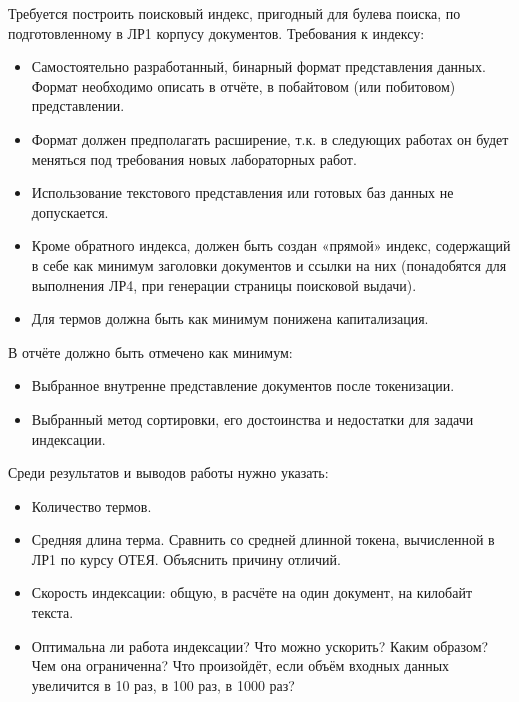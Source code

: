 
Требуется построить поисковый индекс, пригодный для булева поиска, по подготовленному в ЛР1
корпусу документов.
Требования к индексу:

\begin{itemize}
    \item Самостоятельно разработанный, бинарный формат представления данных. Формат
необходимо описать в отчёте, в побайтовом (или побитовом) представлении.
	\item Формат должен предполагать расширение, т.к. в следующих работах он будет меняться
под требования новых лабораторных работ.
	\item Использование текстового представления или готовых баз данных не допускается.
	\item Кроме обратного индекса, должен быть создан «прямой» индекс, содержащий в себе как
минимум заголовки документов и ссылки на них (понадобятся для выполнения ЛР4, при
генерации страницы поисковой выдачи).
	\item Для термов должна быть как минимум понижена капитализация. 
\end{itemize}

В отчёте должно быть отмечено как минимум:
\begin{itemize}
	\item Выбранное внутренне представление документов после токенизации.
	\item Выбранный метод сортировки, его достоинства и недостатки для задачи индексации.
\end{itemize}

Среди результатов и выводов работы нужно указать:
\begin{itemize}
\item Количество термов.
\item Средняя длина терма. Сравнить со средней длинной токена, вычисленной в ЛР1 по курсу ОТЕЯ. Объяснить причину отличий. 
\item Скорость индексации: общую, в расчёте на один документ, на килобайт текста.
\item Оптимальна ли работа индексации? Что можно ускорить? Каким образом? Чем она
ограниченна? Что произойдёт, если объём входных данных увеличится в 10 раз, в 100 раз,
в 1000 раз?
\end{itemize}


\pagebreak
